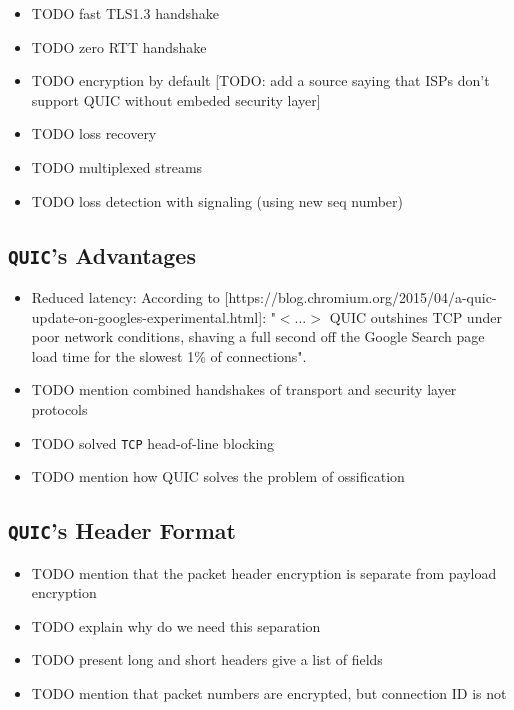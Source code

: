 \documentclass[12pt,a4paper,twoside,openright]{report}
\begin{document}
\begin{itemize}
  \item TODO fast TLS1.3 handshake
 
 
  \item TODO zero RTT handshake
 
  \item TODO encryption by default
  [TODO: add a source saying that ISPs don't support QUIC without embeded security layer]
  
  \item TODO loss recovery
  
  \item TODO multiplexed streams
  
  
  
  
  
  
  \item TODO loss detection with signaling (using new seq number)
  
  
\end{itemize}


\subsection{\texttt{QUIC}'s Advantages}

\begin{itemize}
  \item Reduced latency:
  According to [https://blog.chromium.org/2015/04/a-quic-update-on-googles-experimental.html]: "$<\ldots>$ QUIC outshines TCP under poor network conditions, shaving a full second off the Google Search page load time for the slowest 1\% of connections".
  \item TODO mention combined handshakes of transport and security layer protocols 

  \item TODO solved \texttt{TCP} head-of-line blocking

  
  \item TODO mention how QUIC solves the problem of ossification
\end{itemize}



\subsection{\texttt{QUIC}'s Header Format} \label{subsection_QUIC_header_format}

\begin{itemize}
  \item TODO mention that the packet header encryption is separate from payload encryption
  \item TODO explain why do we need this separation
  \item TODO present long and short headers give a list of fields
  \item TODO mention that packet numbers are encrypted, but connection ID is not
\end{itemize}
\end{document}
